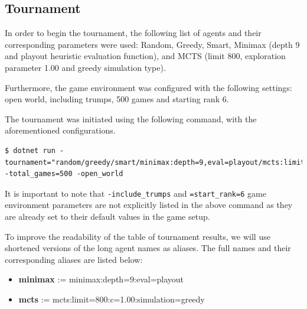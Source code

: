 \subsection{Tournament}
In order to begin the tournament, the following list of agents and their corresponding parameters were used: Random, Greedy, Smart, Minimax (depth 9 and playout heuristic evaluation function), and MCTS (limit 800, exploration parameter 1.00 and greedy simulation type).

Furthermore, the game environment was configured with the following settings: open world, including trumps, 500 games and starting rank 6.

The tournament was initiated using the following command, with the aforementioned configurations.

\begin{lstlisting}
$ dotnet run -tournament="random/greedy/smart/minimax:depth=9,eval=playout/mcts:limit=800,c=1.00,simulation=greedy" -total_games=500 -open_world
\end{lstlisting}

It is important to note that \texttt{-include\_trumps} and \texttt{=start\_rank=6} game environment parameters are not explicitly listed in the above command as they are already set to their default values in the game setup.

To improve the readability of the table of tournament results, we will use shortened versions of the long agent names as aliases. The full names and their corresponding aliases are listed below:

\begin{itemize}
	\item \textbf{minimax} := minimax:depth=9:eval=playout
	\item \textbf{mcts} := mcts:limit=800:c=1.00:simulation=greedy
\end{itemize}

